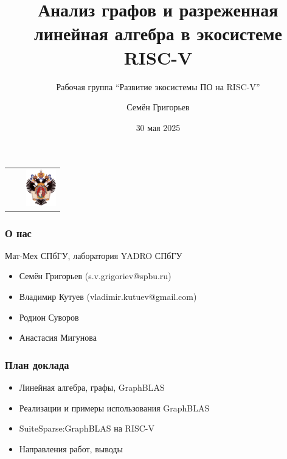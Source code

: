 \documentclass[xcolor=table,aspectratio=169]{beamer}
\title[GraphBLAS на RISC-V]{Анализ графов и разреженная линейная алгебра в экосистеме RISC-V}
\subtitle{Рабочая группа ``Развитие экосистемы ПО на RISC-V''}
\institute[СПбГУ]{
Санкт-Петербургский Государственный Университет
}
\author[Семён Григорьев]{Семён Григорьев}
\date{30 мая 2025}
\begin{document}
{
\begin{frame}[fragile]
  \begin{table}
  \centering
  \begin{tabularx}{\linewidth}{XcX}
    \hfill
    & 
    & \hfill \includegraphics[height=1.6cm]{pictures/SPbGU_Logo.png}
  \end{tabularx}
  \end{table}
  \titlepage
\end{frame}
}

\begin{frame}[fragile]
  \frametitle{О нас}
  Мат-Мех СПбГУ, лаборатория YADRO СПбГУ
  \begin{itemize}
    \item Семён Григорьев (s.v.grigoriev@spbu.ru)
    \item Владимир Кутуев (vladimir.kutuev@gmail.com)
    \item Родион Суворов
    \item Анастасия Мигунова
  \end{itemize}
\end{frame}


\begin{frame}[fragile]
  \frametitle{План доклада}
  \begin{itemize}
    \item Линейная алгебра, графы, GraphBLAS
    \item Реализации и примеры использования GraphBLAS 
    \item SuiteSparse:GraphBLAS на RISC-V
    \item Направления работ, выводы 
  \end{itemize}
\end{frame}
\end{document}
